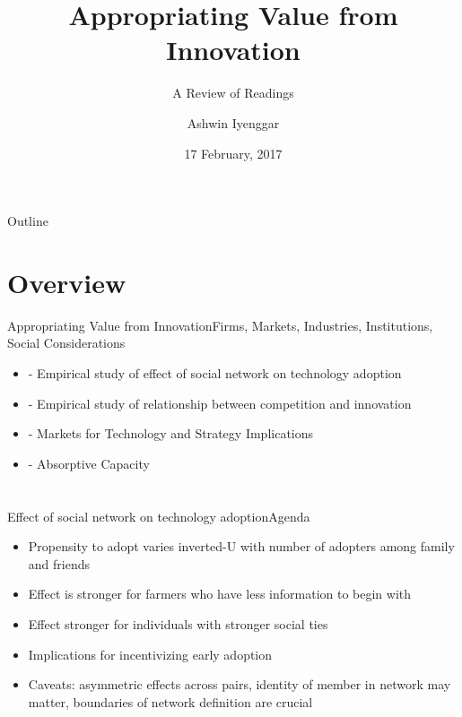 \documentclass{beamer}
\title{Appropriating Value from Innovation}
\subtitle{A Review of Readings}
\author{Ashwin Iyenggar}
\institute[Indian Institute of Management Bangalore] 
{
  Corporate Strategy and Policy\\
  Indian Institute of Management Bangalore
}
\date{17 February, 2017}
\begin{document}
\begin{frame}
  \titlepage
\end{frame}

\begin{frame}{Outline}
  \tableofcontents
\end{frame}

\section{Overview}
\begin{frame}{Appropriating Value from Innovation}{Firms, Markets, Industries, Institutions, Social Considerations}
\begin{itemize}
\item{\cite{Bandiera2006} - Empirical study of effect of social network on technology adoption}
\item{\cite{Aghion2005} - Empirical study of relationship between competition and innovation}
\item{\cite{Arora2001} - Markets for Technology and Strategy Implications}
\item{\cite{Cohen1990} - Absorptive Capacity}
\end{itemize}
\end{frame}



\section{\cite{Bandiera2006}}
\begin{frame}{Effect of social network on technology adoption}{Agenda}
\begin{itemize}
\item{Propensity to adopt varies inverted-U with number of adopters among family and friends}
\item{Effect is stronger for farmers who have less information to begin with}
\item{Effect stronger for individuals with stronger social ties}
\item{Implications for incentivizing early adoption}
\item{Caveats: asymmetric effects across pairs, identity of member in network may matter, boundaries of network definition are crucial}
\end{itemize}
\end{frame}
\end{document}

